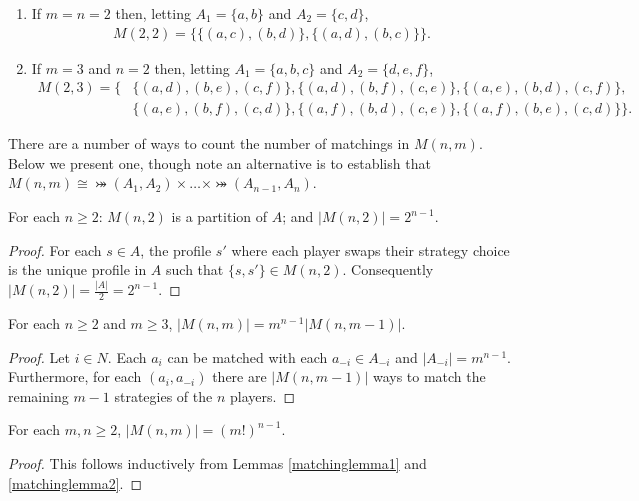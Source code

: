 \begin{example}
	\begin{enumerate}
		\item If $m = n = 2$ then, letting $A_1 = \{a, b\}$ and $A_2 = \{c, d\}$, 
		\begin{align*}
			M(2, 2) = \bigl\{\{(a, c), (b, d)\}, \{(a, d), (b, c)\}\bigr\}.
		\end{align*}
		\item If $m = 3$ and $n = 2$ then, letting $A_1 = \{a, b, c\}$ and $A_2 = \{d, e, f\}$, \
		\begin{align*}
			M(2, 3) = \bigl\{&\{(a, d), (b, e), (c, f)\}, \{(a, d), (b, f), (c, e)\}, \{(a, e), (b, d), (c, f)\}, \\
						&\{(a, e), (b, f), (c, d)\}, \{(a, f), (b, d), (c, e)\}, \{(a, f), (b, e), (c, d)\}\bigr\}.
		\end{align*}
	\end{enumerate}
\end{example}

There are a number of ways to count the number of matchings in $M(n, m)$. Below we present one, though note an alternative is to establish that $M(n, m) \cong \bij(A_1, A_2) \times \ldots \times \bij(A_{n-1}, A_n)$. %

\begin{lemma} \label{matchinglemma1}
	For each $n \geq 2$: $M(n, 2)$ is a partition of $A$; and $|M(n, 2)| = 2^{n-1}$.
	\begin{proof}
		For each $s \in A$, the profile $s'$ where each player swaps their strategy choice is the unique profile in $A$ such that $\{s, s'\} \in M(n, 2)$. Consequently $|M(n, 2)| = \frac{|A|}{2} = 2^{n-1}$. 
	\end{proof}
\end{lemma}

\begin{lemma} \label{matchinglemma2}
	For each $n \geq 2$ and $m \geq 3$, $|M(n, m)| = m^{n-1}|M(n, m-1)|$.
	\begin{proof}
		Let $i \in N$. Each $a_i$ can be matched with each $a_{-i} \in A_{-i}$ and $ |A_{-i}| = m^{n-1}$. Furthermore, for each $(a_i, a_{-i})$ there are $|M(n, m-1)|$ ways to match the remaining $m-1$ strategies of the $n$ players.
	\end{proof}
\end{lemma}

\begin{theorem}
	For each $m, n \geq 2$, $|M(n, m)| = (m!)^{n-1}$.
	\begin{proof}
		This follows inductively from Lemmas \ref{matchinglemma1} and \ref{matchinglemma2}.
	\end{proof}
\end{theorem}
